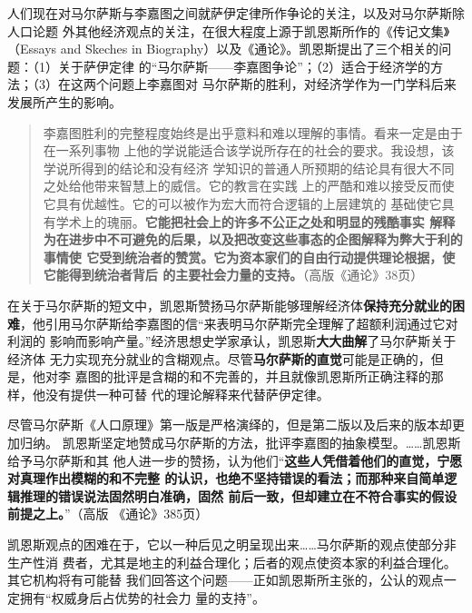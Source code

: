 人们现在对马尔萨斯与李嘉图之间就萨伊定律所作争论的关注，以及对马尔萨斯除人口论题
外其他经济观点的关注，在很大程度上源于凯恩斯所作的《传记文集》（Essays and
Skeches in Biography）以及《通论》。凯恩斯提出了三个相关的问题：（1）关于萨伊定律
的“马尔萨斯——李嘉图争论”；（2）适合于经济学的方法；（3）在这两个问题上李嘉图对
马尔萨斯的胜利，对经济学作为一门学科后来发展所产生的影响。

\begin{quotation}
  李嘉图胜利的完整程度始终是出乎意料和难以理解的事情。看来一定是由于在一系列事物
  上他的学说能适合该学说所存在的社会的要求。我设想，该学说所得到的结论和没有经济
  学知识的普通人所预期的结论具有很大不同之处给他带来智慧上的威信。它的教言在实践
  上的严酷和难以接受反而使它具有优越性。它的可以被作为宏大而符合逻辑的上层建筑的
  基础使它具有学术上的瑰丽。\textbf{它能把社会上的许多不公正之处和明显的残酷事实
    解释为在进步中不可避免的后果，以及把改变这些事态的企图解释为弊大于利的事情使
    它受到统治者的赞赏。它为资本家们的自由行动提供理论根据，使它能得到统治者背后
    的主要社会力量的支持。}（高版《通论》38页）
\end{quotation}

在关于马尔萨斯的短文中，凯恩斯赞扬马尔萨斯能够理解经济体\textbf{保持充分就业的困
  难}，他引用马尔萨斯给李嘉图的信“来表明马尔萨斯完全理解了超额利润通过它对利润的
影响而影响产量。”经济思想史学家承认，凯恩斯\textbf{大大曲解}了马尔萨斯关于经济体
无力实现充分就业的含糊观点。尽管\textbf{马尔萨斯的直觉}可能是正确的，但是，他对李
嘉图的批评是含糊的和不完善的，并且就像凯恩斯所正确注释的那样，他没有提供一种可替
代的理论解释来代替萨伊定律。

尽管马尔萨斯《人口原理》第一版是严格演绎的，但是第二版以及后来的版本却更加归纳。
凯恩斯坚定地赞成马尔萨斯的方法，批评李嘉图的抽象模型。……凯恩斯给予马尔萨斯和其
他人进一步的赞扬，认为他们“\textbf{这些人凭借着他们的直觉，宁愿对真理作出模糊的和不完整
的认识，也绝不坚持错误的看法；而那种来自简单逻辑推理的错误说法固然明白准确，固然
前后一致，但却建立在不符合事实的假设前提之上。}”（高版 《通论》385页）

凯恩斯观点的困难在于，它以一种后见之明呈现出来……马尔萨斯的观点使部分非生产性消
费者，尤其是地主的利益合理化；后者的观点使资本家的利益合理化。其它机构将有可能替
我们回答这个问题——正如凯恩斯所主张的，公认的观点一定拥有“权威身后占优势的社会力
量的支持”。

